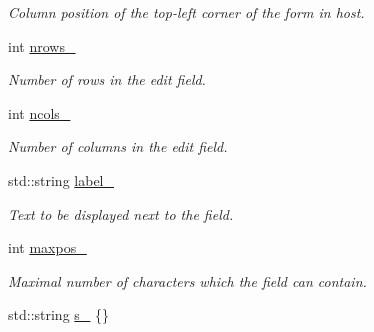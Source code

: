 \begin{DoxyCompactItemize}
\begin{DoxyCompactList}\small\item\em Column position of the top-\/left corner of the form in {\ttfamily host}. \end{DoxyCompactList}\item 
int \hyperlink{structEditField_aef217a23af62343dbf0e3f11e124866d}{nrows\+\_\+}\hypertarget{structEditField_aef217a23af62343dbf0e3f11e124866d}{}\label{structEditField_aef217a23af62343dbf0e3f11e124866d}

\begin{DoxyCompactList}\small\item\em Number of rows in the edit field. \end{DoxyCompactList}\item 
int \hyperlink{structEditField_a2af8a86607652b14891367acc6e74247}{ncols\+\_\+}\hypertarget{structEditField_a2af8a86607652b14891367acc6e74247}{}\label{structEditField_a2af8a86607652b14891367acc6e74247}

\begin{DoxyCompactList}\small\item\em Number of columns in the edit field. \end{DoxyCompactList}\item 
std\+::string \hyperlink{structEditField_ac00110b9d86e2099af6aecaccd165838}{label\+\_\+}\hypertarget{structEditField_ac00110b9d86e2099af6aecaccd165838}{}\label{structEditField_ac00110b9d86e2099af6aecaccd165838}

\begin{DoxyCompactList}\small\item\em Text to be displayed next to the field. \end{DoxyCompactList}\item 
int \hyperlink{structEditField_aa727df198baeaa714eea3c76f4996c92}{maxpos\+\_\+}\hypertarget{structEditField_aa727df198baeaa714eea3c76f4996c92}{}\label{structEditField_aa727df198baeaa714eea3c76f4996c92}

\begin{DoxyCompactList}\small\item\em Maximal number of characters which the field can contain. \end{DoxyCompactList}\item 
std\+::string \hyperlink{structEditField_a2e4e384ae5d37ea3ffa0f33f9cc0ae1b}{s\+\_\+} \{\}\hypertarget{structEditField_a2e4e384ae5d37ea3ffa0f33f9cc0ae1b}{}\label{structEditField_a2e4e384ae5d37ea3ffa0f33f9cc0ae1b}


\end{DoxyCompactItemize}

